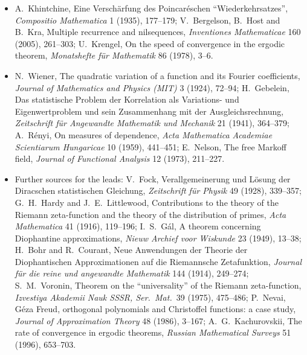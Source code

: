 \begin{itemize}
involving the zeros of the Riemann zeta function, \emph{Advances in Mathematics} 170 (2002), 56--70.
\item A.~Khintchine, Eine Verschärfung des Poincaréschen ``Wiederkehrsatzes'', \emph{Compositio Mathematica} 1 (1935), 177--179; V.~Bergelson, B.~Host and B.~Kra, Multiple recurrence
and nilsequences, \emph{Inventiones Mathematicae} 160 (2005), 261--303; U.~Krengel, On the speed of convergence in the ergodic theorem, \emph{Monatshefte für Mathematik} 86 (1978), 3--6.
\item N.~Wiener, The quadratic variation of a function and its Fourier coefficients, \emph{Journal of Mathematics and Physics (MIT)} 3 (1924), 72--94; H.~Gebelein, Das statistische
Problem der Korrelation als Variations- und Eigenwertproblem und sein Zusammenhang mit der Ausgleichsrechnung, \emph{Zeitschrift für Angewandte Mathematik und Mechanik} 21 (1941),
364--379; A.~Rényi, On measures of dependence, \emph{Acta Mathematica Academiae Scientiarum Hungaricae} 10 (1959), 441--451; E.~Nelson, The free Markoff field, \emph{Journal of
Functional Analysis} 12 (1973), 211--227.
\item Further sources for the leads: V.~Fock, Verallgemeinerung und Lösung der Diracschen statistischen Gleichung, \emph{Zeitschrift für Physik} 49 (1928), 339--357; G.~H.~Hardy and
J.~E.~Littlewood, Contributions to the theory of the Riemann zeta-function and the theory of the distribution of primes, \emph{Acta Mathematica} 41 (1916), 119--196; I.~S.~Gál, A theorem
concerning Diophantine approximations, \emph{Nieuw Archief voor Wiskunde} 23 (1949), 13--38; H.~Bohr and R.~Courant, Neue Anwendungen der Theorie der Diophantischen Approximationen auf
die Riemannsche Zetafunktion, \emph{Journal für die reine und angewandte Mathematik} 144 (1914), 249--274; S.~M.~Voronin, Theorem on the ``universality'' of the Riemann zeta-function,
\emph{Izvestiya Akademii Nauk SSSR, Ser.\ Mat.}\ 39 (1975), 475--486; P.~Nevai, Géza Freud, orthogonal polynomials and Christoffel functions: a case study, \emph{Journal of Approximation
Theory} 48 (1986), 3--167; A.~G.~Kachurovskii, The rate of convergence in ergodic theorems, \emph{Russian Mathematical Surveys} 51 (1996), 653--703.
\end{itemize}
